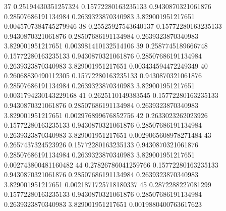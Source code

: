 {37 0.25194430351257324 0.15772280163235133 0.9430870321061876 0.28507686191134984 0.2639323870340983 3.829001951217651 0.0045707384745279946
38 0.25525927543640137 0.15772280163235133 0.9430870321061876 0.28507686191134984 0.2639323870340983 3.829001951217651 0.003981410132514106
39 0.2587745189666748 0.15772280163235133 0.9430870321061876 0.28507686191134984 0.2639323870340983 3.829001951217651 0.003434594472249349
40 0.26068830490112305 0.15772280163235133 0.9430870321061876 0.28507686191134984 0.2639323870340983 3.829001951217651 0.0031794230143229168
41 0.2625110149383545 0.15772280163235133 0.9430870321061876 0.28507686191134984 0.2639323870340983 3.829001951217651 0.002976899676852756
42 0.2633023262023926 0.15772280163235133 0.9430870321061876 0.28507686191134984 0.2639323870340983 3.829001951217651 0.0029065608978271484
43 0.2657437324523926 0.15772280163235133 0.9430870321061876 0.28507686191134984 0.2639323870340983 3.829001951217651 0.002743800481160482
44 0.27826786041259766 0.15772280163235133 0.9430870321061876 0.28507686191134984 0.2639323870340983 3.829001951217651 0.0021871725718180337
45 0.2872288227081299 0.15772280163235133 0.9430870321061876 0.28507686191134984 0.2639323870340983 3.829001951217651 0.0019880400763617623
}\tableexpivwaittseqpred
